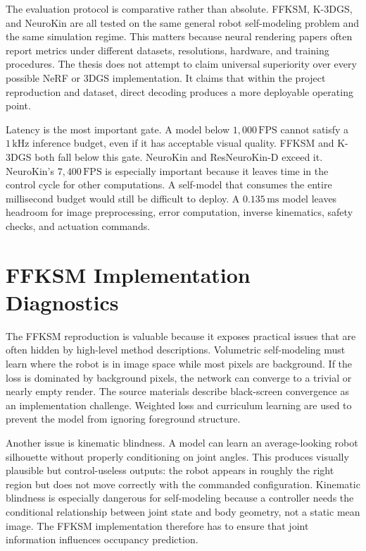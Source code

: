\documentclass[12pt,a4paper,oneside]{report}
\begin{document}
The evaluation protocol is comparative rather than absolute. FFKSM, K-3DGS, and NeuroKin are all tested on the same general robot self-modeling problem and the same simulation regime. This matters because neural rendering papers often report metrics under different datasets, resolutions, hardware, and training procedures. The thesis does not attempt to claim universal superiority over every possible NeRF or 3DGS implementation. It claims that within the project reproduction and dataset, direct decoding produces a more deployable operating point.

Latency is the most important gate. A model below $1{,}000\,\mathrm{FPS}$ cannot satisfy a $1\,\mathrm{kHz}$ inference budget, even if it has acceptable visual quality. FFKSM and K-3DGS both fall below this gate. NeuroKin and ResNeuroKin-D exceed it. NeuroKin's $7{,}400\,\mathrm{FPS}$ is especially important because it leaves time in the control cycle for other computations. A self-model that consumes the entire millisecond budget would still be difficult to deploy. A $0.135\,\mathrm{ms}$ model leaves headroom for image preprocessing, error computation, inverse kinematics, safety checks, and actuation commands.

\section{FFKSM Implementation Diagnostics}

The FFKSM reproduction is valuable because it exposes practical issues that are often hidden by high-level method descriptions. Volumetric self-modeling must learn where the robot is in image space while most pixels are background. If the loss is dominated by background pixels, the network can converge to a trivial or nearly empty render. The source materials describe black-screen convergence as an implementation challenge. Weighted loss and curriculum learning are used to prevent the model from ignoring foreground structure.

Another issue is kinematic blindness. A model can learn an average-looking robot silhouette without properly conditioning on joint angles. This produces visually plausible but control-useless outputs: the robot appears in roughly the right region but does not move correctly with the commanded configuration. Kinematic blindness is especially dangerous for self-modeling because a controller needs the conditional relationship between joint state and body geometry, not a static mean image. The FFKSM implementation therefore has to ensure that joint information influences occupancy prediction.
\end{document}
